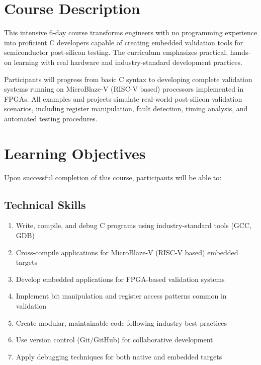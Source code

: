 \documentclass[11pt,a4paper]{article}
\begin{document}
\section{Course Description}

This intensive 6-day course transforms engineers with no programming experience into proficient C developers capable of creating embedded validation tools for semiconductor post-silicon testing. The curriculum emphasizes practical, hands-on learning with real hardware and industry-standard development practices.

Participants will progress from basic C syntax to developing complete validation systems running on MicroBlaze-V (RISC-V based) processors implemented in FPGAs. All examples and projects simulate real-world post-silicon validation scenarios, including register manipulation, fault detection, timing analysis, and automated testing procedures.

\section{Learning Objectives}

Upon successful completion of this course, participants will be able to:

\subsection{Technical Skills}
\begin{enumerate}
    \item Write, compile, and debug C programs using industry-standard tools (GCC, GDB)
    \item Cross-compile applications for MicroBlaze-V (RISC-V based) embedded targets
    \item Develop embedded applications for FPGA-based validation systems
    \item Implement bit manipulation and register access patterns common in validation
    \item Create modular, maintainable code following industry best practices
    \item Use version control (Git/GitHub) for collaborative development
    \item Apply debugging techniques for both native and embedded targets
\end{enumerate}
\end{document}

